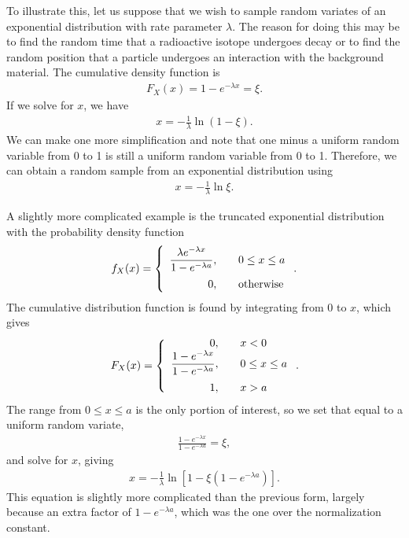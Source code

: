 To illustrate this, let us suppose that we wish to sample random variates of an exponential distribution with rate parameter $\lambda$. The reason for doing this may be to find the random time that a radioactive isotope undergoes decay or to find the random position that a particle undergoes an interaction with the background material. The cumulative density function is
\begin{align}
  F_X(x) = 1 - e^{-\lambda x } = \xi .
\end{align}
If we solve for $x$, we have
\begin{align}
  x = -\frac{1}{\lambda} \ln ( 1 - \xi ) .  \nonumber
\end{align}
We can make one more simplification and note that one minus a uniform random variable from 0 to 1 is still a uniform random variable from 0 to 1. Therefore, we can obtain a random sample from an exponential distribution using
\begin{align}
  x =  -\frac{1}{\lambda} \ln \xi .
\end{align}

A slightly more complicated example is the truncated exponential distribution with the probability density function
\begin{align}
  f_X(x) = \left\{ \begin{array}{r l}
  \dfrac{ \lambda e^{-\lambda x} }{ 1 - e^{-\lambda a } }, & \quad 0 \le x \le a  \vspace{0.2cm}  \\
  0,                                 & \quad \text{otherwise} \\ \end{array} \right. .
\end{align}
The cumulative distribution function is found by integrating from 0 to $x$, which gives
\begin{align}
  F_X(x) = \left\{ \begin{array}{r l}
  0,                                                  & \quad x < 0 \\
  \dfrac{ 1 - e^{-\lambda x} }{ 1 - e^{-\lambda a } }, & \quad 0 \le x \le a   \vspace{0.2cm} \\
  1,                                                  & \quad x > a \\ \end{array} \right. .
\end{align}
The range from $0 \le x \le a$ is the only portion of interest, so we set that equal to a uniform random variate,
\begin{align}
   \frac{ 1 - e^{-\lambda x} }{ 1 - e^{-\lambda a } } = \xi,
\end{align}
and solve for $x$, giving
\begin{align}
   x = -\frac{1}{\lambda} \ln \left[  1 - \xi ( 1 - e^{-\lambda a } ) \right] .
\end{align}
This equation is slightly more complicated than the previous form, largely because an extra factor of $1 - e^{-\lambda a }$, which was the one over the normalization constant.

